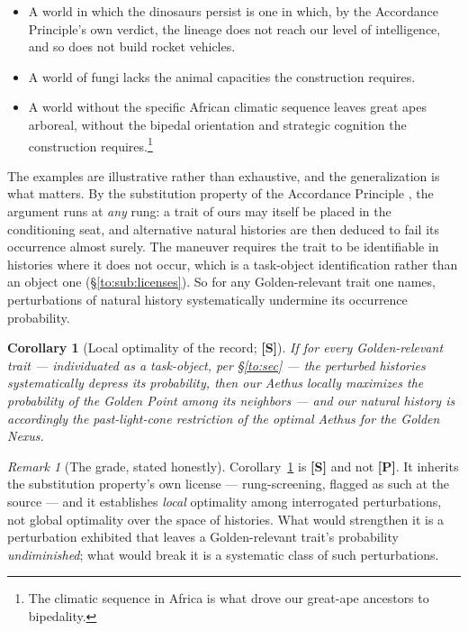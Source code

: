 \documentclass[11pt]{article}
\numberwithin{equation}{section}
\theoremstyle{plain}
\newtheorem{corollary}[theorem]{Corollary}
\theoremstyle{definition}
\theoremstyle{remark}
\newtheorem{remark}[theorem]{Remark}
\begin{document}
\begin{itemize}\itemsep2pt
\item A world in which the dinosaurs persist is one in which, by the
Accordance Principle's own verdict, the lineage does not reach our
level of intelligence, and so does not build rocket vehicles.
\item A world of fungi lacks the animal capacities the construction
requires.
\item A world without the specific African climatic sequence leaves
great apes arboreal, without the bipedal orientation and strategic
cognition the construction requires.\footnote{The climatic sequence in
Africa is what drove our great-ape ancestors to bipedality.}
\end{itemize}

The examples are illustrative rather than exhaustive, and the
generalization is what matters. By the substitution property of the
Accordance Principle \cite{Nexus}, the argument runs at \emph{any}
rung: a trait of ours may itself be placed in the conditioning seat, and
alternative natural histories are then deduced to fail its occurrence
almost surely. The maneuver requires the trait to be identifiable in
histories where it does not occur, which is a task-object
identification rather than an object one
(\S\ref{to:sub:licenses}). So for any Golden-relevant trait one names,
perturbations
of natural history systematically undermine its occurrence probability.

\begin{corollary}[Local optimality of the record; \textbf{[S]}]
\label{gc:cor:localopt}
If for every Golden-relevant trait --- individuated as a task-object,
per \S\ref{to:sec} --- the perturbed histories systematically
depress its probability, then our Aethus locally maximizes the
probability of the Golden Point among its neighbors --- and our natural
history is accordingly the past-light-cone restriction of the optimal
Aethus for the Golden Nexus.
\end{corollary}

\begin{remark}[The grade, stated honestly]\label{gc:rem:grade}
Corollary~\ref{gc:cor:localopt} is \textbf{[S]} and not
\textbf{[P]}. It inherits the substitution property's own license ---
rung-screening, flagged as such at the source \cite{Ben26Optimal} ---
and it establishes \emph{local} optimality among interrogated
perturbations, not global optimality over the space of histories. What
would strengthen it is a perturbation exhibited that leaves a
Golden-relevant trait's probability \emph{undiminished}; what would
break it is a systematic class of such perturbations.
\end{remark}
\end{document}
